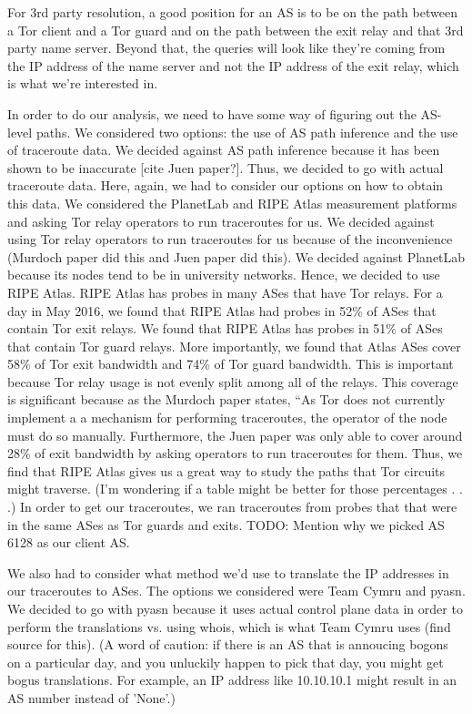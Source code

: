 For 3rd party resolution, a good position for an AS is to be on the path between 
a Tor client and a Tor guard and on the path between the exit relay and that 3rd party 
name server. Beyond that, the queries will look like they're coming from the IP address 
of the name server and not the IP address of the exit relay, which is what we're interested 
in.

In order to do our analysis, we need to have some way of figuring out the AS-level paths. 
We considered two options: the use of AS path inference and the use of traceroute data. 
We decided against AS path inference because it has been shown to be inaccurate [cite 
Juen paper?]. Thus, we decided to go with actual traceroute data. Here, again, we had 
to consider our options on how to obtain this data. We considered the PlanetLab and RIPE 
Atlas measurement platforms and asking Tor relay operators to run traceroutes for us. 
We decided against using Tor relay operators to run traceroutes for us because of the 
inconvenience (Murdoch paper did this and Juen paper did this). We decided against 
PlanetLab because its nodes tend to be in university networks. Hence, we decided to use 
RIPE Atlas. RIPE Atlas has probes in many ASes that have Tor relays. For a day in May 
2016, we found that RIPE Atlas had probes in 52\% of ASes that contain Tor exit relays. 
We found that RIPE Atlas has probes in 51\% of ASes that contain Tor guard relays. More 
importantly, we found that Atlas ASes cover 58\% of Tor exit bandwidth and 74\% of Tor 
guard bandwidth. This is important because Tor relay usage is not evenly split among 
all of the relays. This coverage is significant because as the Murdoch paper states, 
``As Tor does not currently implement a a mechanism for performing traceroutes, the 
operator of the node must do so manually. Furthermore, the Juen paper was only able to 
cover around 28\% of exit bandwidth by asking operators to run traceroutes for them. 
Thus, we find that RIPE Atlas gives us a great way to study the paths that Tor circuits 
might traverse. (I'm wondering if a table might be better for those percentages . . .)
In order to get our traceroutes, we ran traceroutes from probes that that were in the 
same ASes as Tor guards and exits. TODO: Mention why we picked AS 6128 as our client AS.

We also had to consider what method we'd use to translate the IP addresses in our 
traceroutes to ASes. The options we considered were Team Cymru and pyasn. We decided to 
go with pyasn because it uses actual control plane data in order to perform the 
translations vs. using whois, which is what Team Cymru uses (find source for this). 
(A word of caution: if there is an AS that is annoucing bogons on a particular day, and 
you unluckily happen to pick that day, you might get bogus translations. For example, an 
IP address like 10.10.10.1 might result in an AS number instead of 'None'.)

